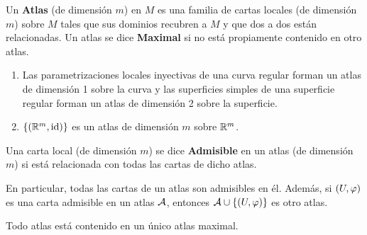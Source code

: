 \documentclass[cursovd_portada.tex]{subfiles}
\begin{document}
\begin{defi}
Un {\bf Atlas} (de dimensión $m$) en $M$ es una familia de cartas locales (de dimensión $m$) sobre $M$ tales que
sus dominios recubren a $M$ y que dos a dos están relacionadas. Un atlas se dice {\bf Maximal} si no está
propiamente contenido en otro atlas.
\end{defi}
\begin{ej}
{\rm
\begin{enumerate}
\item Las parametrizaciones locales inyectivas de una curva regular forman un atlas de dimensión 1 sobre la curva y las
superficies simples de una superficie regular forman un atlas de dimensión 2 sobre la superficie.
\item $\{(\mathbb{R}^m,{\rm id})\}$ es un atlas de dimensión $m$ sobre $\mathbb{R}^m$.
\end{enumerate}}
\end{ej}
\begin{defi}
Una carta local (de dimensión $m$) se dice {\bf Admisible} en un atlas (de dimensión $m$) si está relacionada con
todas las cartas de dicho atlas.
\end{defi}
En particular, todas las cartas de un atlas son admisibles en él. Además, si $(U,\varphi)$ es una carta admisible en
un atlas ${\cal A}$, entonces ${\cal A}\cup\{(U,\varphi)\}$ es otro atlas.
\begin{prop}
Todo atlas está contenido en un único atlas maximal.
\end{prop}
\end{document}
